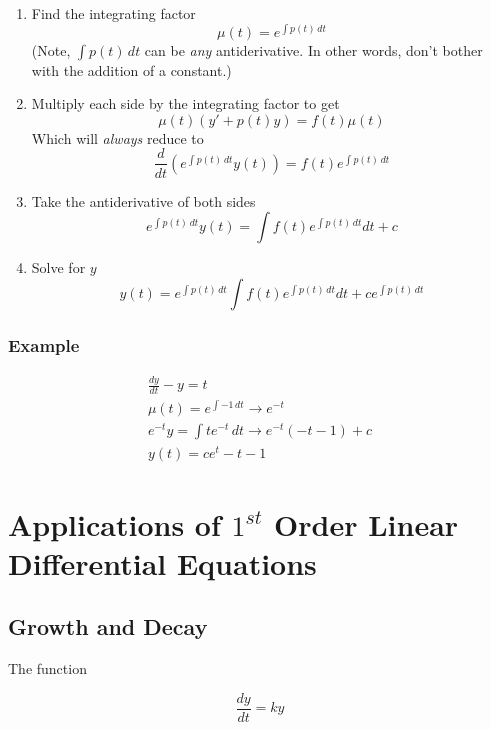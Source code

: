     \begin{enumerate}
    \item Find the integrating factor
        \[
        \mu(t) = e^{\int p(t) \, dt}
        \]
        (Note, $\int p(t) \, dt$ can be \textit{any} antiderivative. In other words, don't bother with the addition of a constant.)
    \item Multiply each side by the integrating factor to get
        \[
        \mu(t)(y\prime + p(t)y) = f(t)\mu(t)
        \]
        Which will \textit{always} reduce to
        \[
        \frac{d}{dt} \left( e^{\int p(t) \, dt} y(t) \right) = f(t) e^{\int p(t) \, dt}
        \]
    \item Take the antiderivative of both sides
        \[
        e^{\int p(t) \, dt} y(t) = \int f(t) e^{\int p(t) \, dt} dt + c
        \]
    \item Solve for $y$
        \begin{equation}\label{eq:ifmethod}
        y(t) = e^{\int p(t) \, dt} \int f(t) e^{\int p(t) \, dt} dt + c e^{\int p(t) \, dt}
        \end{equation}
    \end{enumerate}

        \subsubsection{Example}
        \[
        \begin{aligned}
        \frac{dy}{dt} - y = t\\
        \mu(t) = e^{\int -1 \, dt} \to e^{-t}\\
        e^{-t}y = \int t e^{-t} \, dt \to e^{-t} (-t - 1) + c\\
        y(t) = c e^t - t - 1
        \end{aligned}
        \]

\section{Applications of $1^{st}$ Order Linear Differential Equations}
    \subsection{Growth and Decay}

    The function

    \[
    \frac{dy}{dt} = ky
    \]

